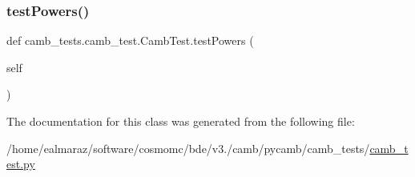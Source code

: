 \subsubsection{\texorpdfstring{test\+Powers()}{testPowers()}}
{\footnotesize\ttfamily def camb\+\_\+tests.\+camb\+\_\+test.\+Camb\+Test.\+test\+Powers (\begin{DoxyParamCaption}\item[{}]{self }\end{DoxyParamCaption})}



The documentation for this class was generated from the following file\+:\begin{DoxyCompactItemize}
\item 
/home/ealmaraz/software/cosmomc/bde/v3./camb/pycamb/camb\+\_\+tests/\mbox{\hyperlink{camb__test_8py}{camb\+\_\+test.\+py}}\end{DoxyCompactItemize}
